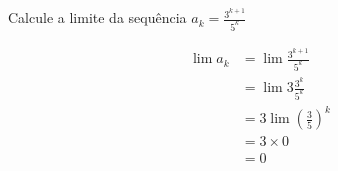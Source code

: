 \documentclass[a4paper,12pt,fleqn]{article}
\begin{document}
Calcule a limite da sequência \(a_k = \frac{3^{k+1}}{5^k}\)

\begin{answer}
  \begin{align*}
    \lim a_k
    & = \lim \frac{3^{k+1}}{5^k} \\[2mm]
    & = \lim 3 \frac{3^{k}}{5^k} \\[2mm]
    & = 3\lim \left(\frac{3}{5}\right)^k \\[2mm]
    & = 3 \times 0 \\[2mm]
    & = 0
  \end{align*}
  \clearpage
\end{answer}

\end{document}
